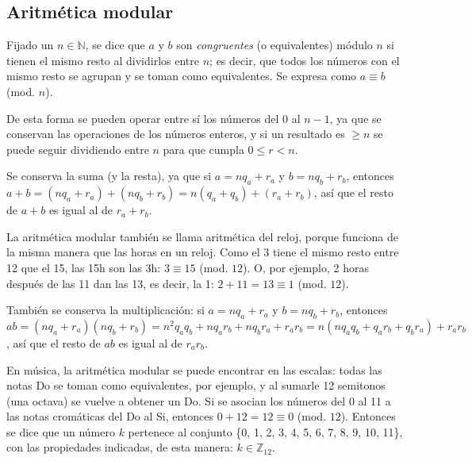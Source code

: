 	\subsection{Aritmética modular}
		Fijado un $n\in\mathbb{N}$, se dice que $a$ y $b$ son \emph{congruentes} (o equivalentes) módulo $n$ si tienen el mismo resto al dividirlos entre $n$; es decir, que todos los números con el mismo resto se agrupan y se toman como equivalentes. Se expresa como $a\equiv b$ (mod. $n$).
	
		De esta forma se pueden operar entre sí los números del 0 al $n-1$, ya que se conservan las operaciones de los números enteros, y si un resultado es $\geq n$ se puede seguir dividiendo entre $n$ para que cumpla $0\leq r<n$.
		
		Se conserva la suma (y la resta), ya que si $a=nq_a+r_a$ y $b=nq_b+r_b$, entonces $a+b=(nq_a+r_a)+(nq_b+r_b)=n(q_a+q_b)+(r_a+r_b)$, así que el resto de $a+b$ es igual al de $r_a+r_b$.
		
		La {aritmética modular} también se llama aritmética del reloj, porque funciona de la misma manera que las horas en un reloj. Como el 3 tiene el mismo resto entre 12 que el 15, las 15h son las 3h: $3\equiv15$ (mod. $12$). O, por ejemplo, 2 horas después de las 11 dan las 13, es decir, la 1: $2+11=13\equiv1$ (mod. $12$). 
		
		También se conserva la multiplicación: si $a=nq_a+r_a$ y $b=nq_b+r_b$, entonces $ab=(nq_a+r_a)(nq_b+r_b)=n^2q_aq_b+nq_ar_b+nq_br_a+r_ar_b=n(nq_aq_b+q_ar_b+q_br_a)+r_ar_b$, así que el resto de $ab$ es igual al de $r_ar_b$.
		
		En música, la aritmética modular se puede encontrar en las escalas: todas las notas Do se toman como equivalentes, por ejemplo, y al sumarle 12 semitonos (una octava) se vuelve a obtener un Do. Si se asocian los números del 0 al 11 a las notas cromáticas del Do al Si, entonces $0+12=12\equiv0$ (mod. $12$). Entonces se dice que un número $k$ pertenece al conjunto \{0, 1, 2, 3, 4, 5, 6, 7, 8, 9, 10, 11\}, con las propiedades indicadas, de esta manera: $k\in\mathbb{Z}_{12}$.